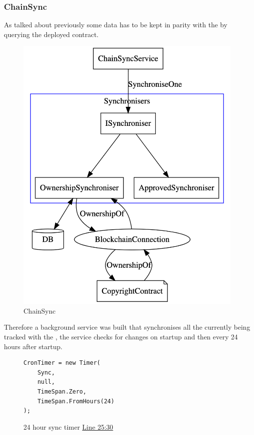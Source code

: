\subsubsection{ChainSync}
\label{sec:chainSync}

As talked about previously some data has to be kept in parity with the  by querying the deployed contract.

\begin{figure}[H]
\caption{ChainSync}
\centering
\includegraphics[width=\textwidth,height=0.5\textheight,keepaspectratio]{images/operational/chain-sync}
\end{figure}

Therefore a background service was built that synchronises all the  currently being tracked with the , the service checks for changes on startup and then every 24 hours after startup.

\begin{figure}[H]
\caption{24 hour sync timer \href{https://github.com/MrHarrisonBarker/CRPL/blob/main/CRPL.Web/Core/ChainSync/ChainSyncService.cs}{Line 25:30}}
\centering
\begin{lstlisting}[language=CSharp]
CronTimer = new Timer(
	Sync,
	null,
	TimeSpan.Zero,
	TimeSpan.FromHours(24)
);
\end{lstlisting}
\end{figure}

